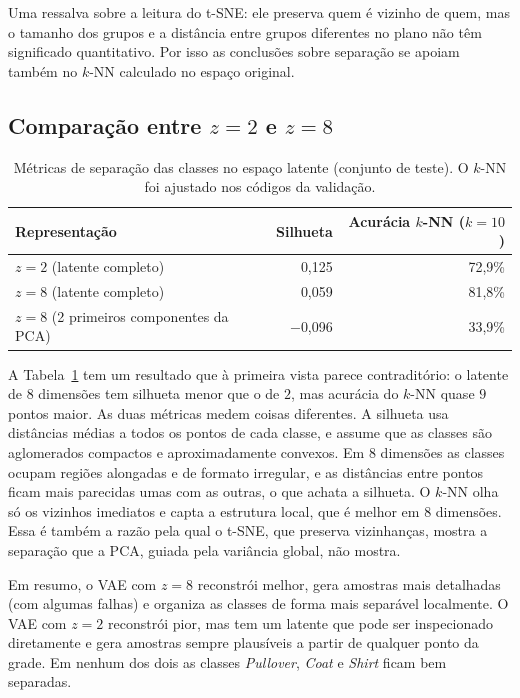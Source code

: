\documentclass[11pt,a4paper]{article}
\begin{document}
Uma ressalva sobre a leitura do t-SNE: ele preserva quem é vizinho de quem, mas o tamanho dos grupos e a distância entre grupos diferentes no plano não têm significado quantitativo. Por isso as conclusões sobre separação se apoiam também no $k$-NN calculado no espaço original.

\subsection{Comparação entre $z = 2$ e $z = 8$}

\begin{table}[H]
\centering
\caption{Métricas de separação das classes no espaço latente (conjunto de teste). O $k$-NN foi ajustado nos códigos da validação.}
\label{tab:sep}
\small
\begin{tabular}{lrr}
\toprule
Representação & Silhueta & Acurácia $k$-NN ($k=10$) \\
\midrule
$z = 2$ (latente completo)        & 0,125    & 72,9\% \\
$z = 8$ (latente completo)        & 0,059    & 81,8\% \\
$z = 8$ (2 primeiros componentes da PCA) & $-$0,096 & 33,9\% \\
\bottomrule
\end{tabular}
\end{table}

A Tabela~\ref{tab:sep} tem um resultado que à primeira vista parece contraditório: o latente de $8$ dimensões tem silhueta menor que o de $2$, mas acurácia do $k$-NN quase $9$ pontos maior. As duas métricas medem coisas diferentes. A silhueta usa distâncias médias a todos os pontos de cada classe, e assume que as classes são aglomerados compactos e aproximadamente convexos. Em $8$ dimensões as classes ocupam regiões alongadas e de formato irregular, e as distâncias entre pontos ficam mais parecidas umas com as outras, o que achata a silhueta. O $k$-NN olha só os vizinhos imediatos e capta a estrutura local, que é melhor em $8$ dimensões. Essa é também a razão pela qual o t-SNE, que preserva vizinhanças, mostra a separação que a PCA, guiada pela variância global, não mostra.

Em resumo, o VAE com $z = 8$ reconstrói melhor, gera amostras mais detalhadas (com algumas falhas) e organiza as classes de forma mais separável localmente. O VAE com $z = 2$ reconstrói pior, mas tem um latente que pode ser inspecionado diretamente e gera amostras sempre plausíveis a partir de qualquer ponto da grade. Em nenhum dos dois as classes \textit{Pullover}, \textit{Coat} e \textit{Shirt} ficam bem separadas.
\end{document}
